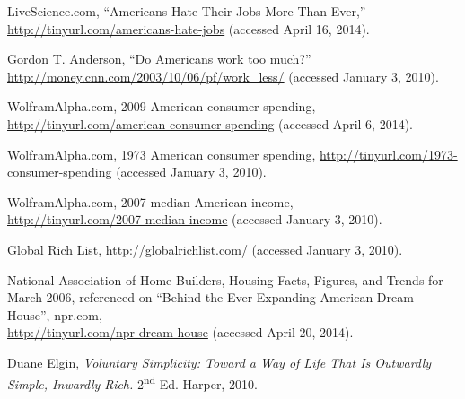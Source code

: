\begin{thebibliography}{9}

LiveScience.com,
``Americans Hate Their Jobs More Than Ever,''
\url{http://tinyurl.com/americans-hate-jobs}
(accessed April 16, 2014).

Gordon T. Anderson,
``Do Americans work too much?''
\url{http://money.cnn.com/2003/10/06/pf/work\_less/}
(accessed January 3, 2010).

WolframAlpha.com, 2009 \- American consumer spending,
\url{http://tinyurl.com/american-consumer-spending}
(accessed April 6, 2014).

WolframAlpha.com, 1973 \- American consumer spending,
\url{http://tinyurl.com/1973-consumer-spending}
(accessed January 3, 2010).

Wol\-fram\-Alpha.com, 2007 median American income,
\\\url{http://tinyurl.com/2007-median-income}
(accessed January 3, 2010).

Global Rich List,
\url{http://globalrichlist.com/}
(accessed January 3, 2010).

National Association of Home Builders, Housing Facts, Figures, and Trends for March 2006,
referenced on ``Behind the Ever-Expanding American Dream House'', npr.com,
\\\url{http://tinyurl.com/npr-dream-house}
(accessed April 20, 2014).

Duane Elgin,
\emph{Voluntary Simplicity: Toward a Way of Life That Is Outwardly Simple, Inwardly Rich.}
2\textsuperscript{nd} Ed.
Harper, 2010.

\end{thebibliography}
